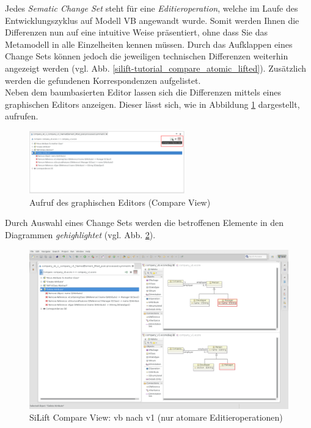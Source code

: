 \documentclass[a4paper]{scrartcl}
\begin{document}
Jedes \textit{Sematic Change Set} steht für eine \textit{Editieroperation}, welche im Laufe des Entwicklungszyklus auf Modell VB angewandt wurde.
Somit werden Ihnen die Differenzen nun auf eine intuitive Weise präsentiert, ohne dass Sie das Metamodell in alle Einzelheiten kennen müssen.
Durch das Aufklappen eines Change Sets können jedoch die jeweiligen technischen Differenzen weiterhin angezeigt werden (vgl. Abb. \ref{silift-tutorial_compare_atomic_lifted}).
Zusätzlich werden die gefundenen Korrespondenzen aufgelistet.\\
Neben dem baumbasierten Editor lassen sich die Differenzen mittels eines graphischen Editors anzeigen.
Dieser lässt sich, wie in Abbildung \ref{silift-tutorial_compare_arrange_compare_view} dargestellt, aufrufen.

\begin{figure}[H]
\centering
\includegraphics[width=0.6\textwidth]{graphics/silift-tutorial_compare_arrange_compare_view.png}
\caption{Aufruf des graphischen Editors (Compare View)}
\label{silift-tutorial_compare_arrange_compare_view}
\end{figure}

Durch Auswahl eines Change Sets werden die betroffenen Elemente in den Diagrammen \textit{gehighlightet} (vgl. Abb. \ref{silift-tutorial_compare_compare_view}).

\begin{figure}[H]
\centering
\includegraphics[width=\textwidth]{graphics/silift-tutorial_compare_compare_view.png}
\caption{SiLift Compare View: vb nach v1 (nur atomare Editieroperationen)}
\label{silift-tutorial_compare_compare_view}
\end{figure}
\end{document}
